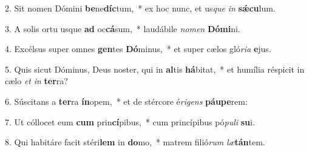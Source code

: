 2. Sit nomen Dómini \textbf{be}ne\textbf{díc}tum,~*  ex hoc nunc, et us\textit{que} \textit{in} \textbf{sǽ}\textbf{cu}lum.\

3. A solis ortu usque \textbf{ad} oc\textbf{cá}sum,~*  laudábile \textit{no}\textit{men} \textbf{Dó}\textbf{mi}ni.\

4. Excélsus super omnes \textbf{gen}tes \textbf{Dó}minus,~*  et super cælos gló\textit{ri}\textit{a} \textbf{e}jus.\

5. Quis sicut Dóminus, Deus noster, qui in \textbf{al}tis \textbf{há}bitat,~*  et humília réspicit in cælo \textit{et} \textit{in} \textbf{ter}ra?\

6. Súscitans a \textbf{ter}ra \textbf{ín}opem,~*  et de stércore é\textit{ri}\textit{gens} \textbf{páu}\textbf{pe}rem:\

7. Ut cóllocet eum \textbf{cum} prin\textbf{cí}pibus,~*  cum princípibus pó\textit{pu}\textit{li} \textbf{su}i.\

8. Qui habitáre facit stéri\textbf{lem} in \textbf{do}mo,~*  matrem filió\textit{rum} \textit{læ}\textbf{tán}tem.\

